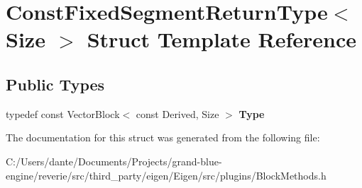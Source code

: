\hypertarget{struct_const_fixed_segment_return_type}{}\section{Const\+Fixed\+Segment\+Return\+Type$<$ Size $>$ Struct Template Reference}
\label{struct_const_fixed_segment_return_type}
\subsection*{Public Types}
\begin{DoxyCompactItemize}
\item 
\mbox{\label{struct_const_fixed_segment_return_type_af181183dece4cc094f1d4902ade7d121}} 
typedef const Vector\+Block$<$ const Derived, Size $>$ {\bfseries Type}
\end{DoxyCompactItemize}


The documentation for this struct was generated from the following file\+:\begin{DoxyCompactItemize}
\item 
C\+:/\+Users/dante/\+Documents/\+Projects/grand-\/blue-\/engine/reverie/src/third\+\_\+party/eigen/\+Eigen/src/plugins/Block\+Methods.\+h\end{DoxyCompactItemize}
